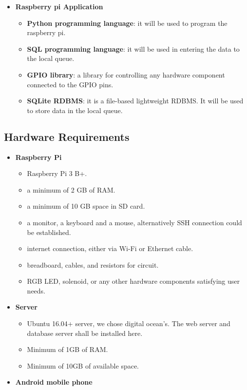 \documentclass[12pt, oneside, a4paper]{book}
\newcommand\boldcolor[1]{\textcolor{bold}{\textbf{#1}}}
\begin{document}
\begin{itemize}
				\item \boldcolor{Raspberry pi Application}
				\begin{itemize}
					\item \textbf{Python programming language}: it will be used to program the raspberry pi.
					\item \textbf{SQL programming language}: it will be used in entering the data to the local queue.
					\item \textbf{GPIO library}: a library for controlling any hardware component connected to the GPIO pins\cite{gpio}.
					\item \textbf{SQLite RDBMS}: it is a file-based lightweight RDBMS\cite{sqlite}. It will be used to store data in the local queue.
				\end{itemize}

			\end{itemize}
			\newpage\subsection{Hardware Requirements}
				\begin{itemize}
					\item \boldcolor{Raspberry Pi} 
					\begin{itemize}
						\item Raspberry Pi 3 B+.
						\item a minimum of 2 GB of RAM.
						\item a minimum of 10 GB space in SD card.
						\item a monitor, a keyboard and a mouse, alternatively SSH connection could be established.
						\item internet connection, either via Wi-Fi or Ethernet cable.
						\item breadboard, cables, and resistors for circuit.
						\item RGB LED, solenoid, or any other hardware components satisfying user needs.
					\end{itemize}
					\item \boldcolor{Server} 
					\begin{itemize}
						\item Ubuntu 16.04+ server, we chose digital ocean's. The web server and database server shall be installed here.
						\item Minimum of 1GB of RAM.
						\item Minimum of 10GB of available space.
					\end{itemize}
					\item \boldcolor{Android mobile phone} 
				\end{itemize}
\end{document}
